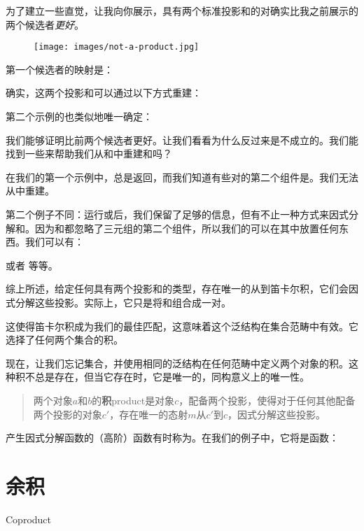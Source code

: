 为了建立一些直觉，让我向你展示，具有两个标准投影和的对确实比我之前展示的两个候选者\emph{更好}。

\begin{figure}[H]
  \centering
  \texttt{[image: images/not-a-product.jpg]}
\end{figure}

\noindent
第一个候选者的映射是：

确实，这两个投影和可以通过以下方式重建：

第二个示例的也类似地唯一确定：

我们能够证明比前两个候选者更好。让我们看看为什么反过来是不成立的。我们能找到一些来帮助我们从和中重建和吗？

在我们的第一个示例中，总是返回，而我们知道有些对的第二个组件是。我们无法从中重建。

第二个例子不同：运行或后，我们保留了足够的信息，但有不止一种方式来因式分解和。因为和都忽略了三元组的第二个组件，所以我们的可以在其中放置任何东西。我们可以有：


或者
等等。

综上所述，给定任何具有两个投影和的类型，存在唯一的从到笛卡尔积，它们会因式分解这些投影。实际上，它只是将和组合成一对。

这使得笛卡尔积成为我们的最佳匹配，这意味着这个泛结构在集合范畴中有效。它选择了任何两个集合的积。

现在，让我们忘记集合，并使用相同的泛结构在任何范畴中定义两个对象的积。这种积不总是存在，但当它存在时，它是唯一的，同构意义上的唯一性。

\begin{quote}
  两个对象$a$和$b$的\textbf{积}{product}是对象$c$，配备两个投影，使得对于任何其他配备两个投影的对象$c'$，存在唯一的态射$m$从$c'$到$c$，因式分解这些投影。
\end{quote}

\noindent
产生因式分解函数的（高阶）函数有时称为。在我们的例子中，它将是函数：


\section{余积}{Coproduct}

